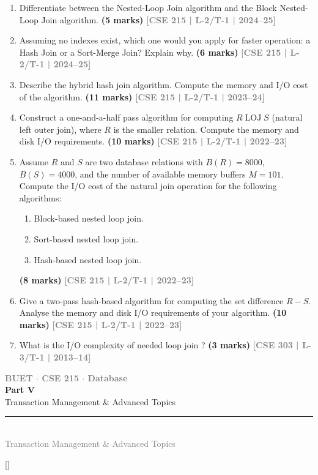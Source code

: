 \documentclass[12pt]{article}
\newcommand{\yr}[1]{\hfill\textcolor{gray}{\small\textbf{[#1]}}}
\newcommand{\mk}[1]{\textcolor{orange!70!black}{\small\textbf{(#1 marks)}}}
\newcommand{\secdivider}[4]{%
  \newpage\thispagestyle{empty}%
  \vspace*{\fill}%
  \begin{tcolorbox}[enhanced,colback=#4!7,colframe=#3,boxrule=1.5pt,arc=8pt,
    left=20pt,right=20pt,top=22pt,bottom=22pt,
    shadow={3pt}{-3pt}{0pt}{black!15}]
    \centering
    {\large\textcolor{gray}{\textbf{BUET $\cdot$ CSE 215 $\cdot$ Database}}}\\[8pt]
    {\fontsize{26}{32}\selectfont\bfseries\textcolor{#3}{#1}}\\[6pt]
    {\fontsize{15}{19}\selectfont\textcolor{dgray}{#2}}\\[12pt]
    \textcolor{#3!60}{\rule{0.5\textwidth}{0.5pt}}\\[6pt]
    {\small\textcolor{gray}{#2}}
  \end{tcolorbox}%
  \vspace*{\fill}\newpage%
}
\begin{document}
\begin{enumerate}
    
\item Differentiate between the Nested-Loop Join algorithm and the Block Nested-Loop Join algorithm.
\mk{5} \yr{CSE 215 | L-2/T-1 | 2024--25}


\item Assuming no indexes exist, which one would you apply for faster operation: a Hash Join or a Sort-Merge Join? Explain why.
\mk{6} \yr{CSE 215 | L-2/T-1 | 2024--25}


\item Describe the hybrid hash join algorithm. Compute the memory and I/O cost of the algorithm.
\mk{11} \yr{CSE 215 | L-2/T-1 | 2023--24}


\item Construct a one-and-a-half pass algorithm for computing $R \mathbin{\text{LOJ}} S$ (natural left outer join), where $R$ is the smaller relation. Compute the memory and disk I/O requirements.
\mk{10} \yr{CSE 215 | L-2/T-1 | 2022--23}


\item Assume $R$ and $S$ are two database relations with $B(R) = 8000$, $B(S) = 4000$, and the number of available memory buffers $M = 101$. Compute the I/O cost of the natural join operation for the following algorithms:
\begin{enumerate}
  \item Block-based nested loop join.
  \item Sort-based nested loop join.
  \item Hash-based nested loop join.
\end{enumerate}
\mk{8} \yr{CSE 215 | L-2/T-1 | 2022--23}


\item Give a two-pass hash-based algorithm for computing the set difference $R - S$. Analyse the memory and disk I/O requirements of your algorithm.
\mk{10} \yr{CSE 215 | L-2/T-1 | 2022--23}


\item What is the I/O complexity of needed loop join ?
\mk{3} \yr{CSE 303 | L-3/T-1 | 2013--14} 


\end{enumerate}


\secdivider{Part V}{Transaction Management \& Advanced Topics}{cE}{cE}
\titleformat{\section}{\large\bfseries\color{cE}}{}{0em}{}[\titlerule]
\end{document}
